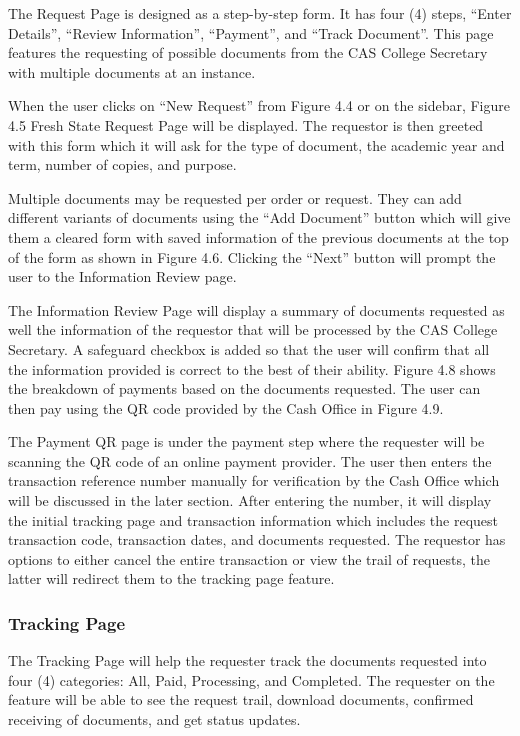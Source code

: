 The Request Page is designed as a step-by-step form. It has four (4) steps, “Enter Details”, “Review Information”, “Payment”, and “Track Document”. This page features the requesting of possible documents from the CAS College Secretary with multiple documents at an instance.

When the user clicks on “New Request” from Figure 4.4 or on the sidebar, Figure 4.5 Fresh State Request Page will be displayed. The requestor is then greeted with this form which it will ask for the type of document, the academic year and term, number of copies, and purpose. 

Multiple documents may be requested per order or request. They can add different variants of documents using the “Add Document” button which will give them a cleared form with saved information of the previous documents at the top of the form as shown in Figure 4.6. Clicking the “Next” button will prompt the user to the Information Review page.

The Information Review Page will display a summary of documents requested as well the information of the requestor that will be processed by the CAS College Secretary. A safeguard checkbox is added so that the user will confirm that all the information provided is correct to the best of their ability. Figure 4.8 shows the breakdown of payments based on the documents requested. The user can then pay using the QR code provided by the Cash Office in Figure 4.9.

The Payment QR page is under the payment step where the requester will be scanning the QR code of an online payment provider. The user then enters the transaction reference number manually for verification by the Cash Office which will be discussed in the later section. After entering the number, it will display the initial tracking page and transaction information which includes the request transaction code, transaction dates, and documents requested. The requestor has options to either cancel the entire transaction or view the trail of requests, the latter will redirect them to the tracking page feature.

\subsubsection{Tracking Page}

The Tracking Page will help the requester track the documents requested into four (4) categories: All, Paid, Processing, and Completed.  The requester on the feature will be able to see the request trail, download documents, confirmed receiving of documents, and get status updates.

